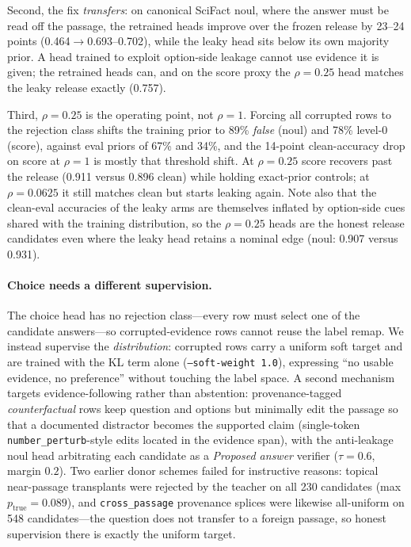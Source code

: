\documentclass[11pt]{article}
\begin{document}
Second, the fix \emph{transfers}: on canonical SciFact noul, where the
answer must be read off the passage, the retrained heads improve over
the frozen release by 23--24 points (0.464$\to$0.693--0.702), while
the leaky head sits below its own majority prior. A head trained to
exploit option-side leakage cannot use evidence it is given; the
retrained heads can, and on the score proxy the $\rho{=}0.25$ head
matches the leaky release exactly (0.757).

Third, $\rho{=}0.25$ is the operating point, not $\rho{=}1$. Forcing
all corrupted rows to the rejection class shifts the training prior to
89\% \emph{false} (noul) and 78\% level-0 (score), against eval priors
of 67\% and 34\%, and the 14-point clean-accuracy drop on score at
$\rho{=}1$ is mostly that threshold shift. At $\rho{=}0.25$ score
recovers past the release (0.911 versus 0.896 clean) while holding
exact-prior controls; at $\rho{=}0.0625$ it still matches clean but
starts leaking again. Note also that the clean-eval accuracies of the
leaky arms are themselves inflated by option-side cues shared with the
training distribution, so the $\rho{=}0.25$ heads are the honest
release candidates even where the leaky head retains a nominal edge
(noul: 0.907 versus 0.931).

\paragraph{Choice needs a different supervision.}
The choice head has no rejection class---every row must select one of
the candidate answers---so corrupted-evidence rows cannot reuse the
label remap. We instead supervise the \emph{distribution}: corrupted
rows carry a uniform soft target and are trained with the KL term
alone (\texttt{--soft-weight 1.0}), expressing ``no usable evidence,
no preference'' without touching the label space. A second mechanism
targets evidence-following rather than abstention: provenance-tagged
\emph{counterfactual} rows keep question and options but minimally
edit the passage so that a documented distractor becomes the supported
claim (single-token \texttt{number\_perturb}-style edits located in
the evidence span), with the anti-leakage noul head arbitrating each
candidate as a \emph{Proposed answer} verifier
($\tau{=}0.6$, margin $0.2$). Two earlier donor schemes failed for
instructive reasons: topical near-passage transplants were rejected by
the teacher on all 230 candidates (max $p_\mathrm{true}{=}0.089$), and
\texttt{cross\_passage} provenance splices were likewise all-uniform
on 548 candidates---the question does not transfer to a foreign
passage, so honest supervision there is exactly the uniform target.
\end{document}
